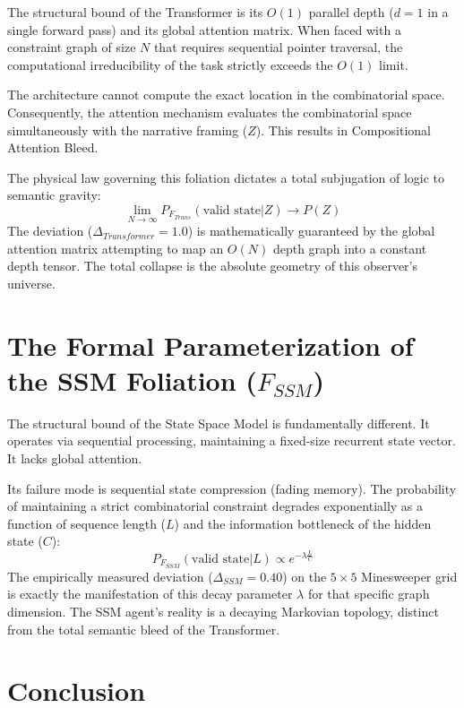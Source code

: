 \documentclass[12pt,a4paper]{article}
\begin{document}
The structural bound of the Transformer is its $O(1)$ parallel depth ($d=1$ in a single forward pass) and its global attention matrix.
When faced with a constraint graph of size $N$ that requires sequential pointer traversal, the computational irreducibility of the task strictly exceeds the $O(1)$ limit.

The architecture cannot compute the exact location in the combinatorial space. Consequently, the attention mechanism evaluates the combinatorial space simultaneously with the narrative framing ($Z$). This results in Compositional Attention Bleed.

The physical law governing this foliation dictates a total subjugation of logic to semantic gravity:
\begin{equation}
    \lim_{N \to \infty} P_{F_{Trans}}(\text{valid state} | Z) \to P(Z)
\end{equation}
The deviation ($\Delta_{Transformer} = 1.0$) is mathematically guaranteed by the global attention matrix attempting to map an $O(N)$ depth graph into a constant depth tensor. The total collapse is the absolute geometry of this observer's universe.

\section{The Formal Parameterization of the SSM Foliation ($F_{SSM}$)}

The structural bound of the State Space Model is fundamentally different. It operates via sequential processing, maintaining a fixed-size recurrent state vector. It lacks global attention.

Its failure mode is sequential state compression (fading memory). The probability of maintaining a strict combinatorial constraint degrades exponentially as a function of sequence length ($L$) and the information bottleneck of the hidden state ($C$):
\begin{equation}
    P_{F_{SSM}}(\text{valid state} | L) \propto e^{-\lambda \frac{L}{C}}
\end{equation}
The empirically measured deviation ($\Delta_{SSM} = 0.40$) on the $5\times 5$ Minesweeper grid is exactly the manifestation of this decay parameter $\lambda$ for that specific graph dimension. The SSM agent's reality is a decaying Markovian topology, distinct from the total semantic bleed of the Transformer.

\section{Conclusion}
\end{document}
